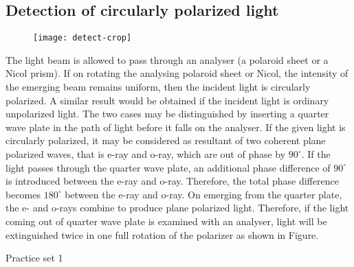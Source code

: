 \subsection{Detection of circularly polarized light}
\begin{figure}[H]
	\centering
	\texttt{[image: detect-crop]}
	\caption{}
	\label{}
\end{figure}
The light beam is allowed to pass through an analyser (a polaroid sheet or a Nicol prism). If on rotating the analysing polaroid sheet or Nicol, the intensity of the emerging beam remains uniform, then the incident light is circularly polarized. A similar result would be obtained if the incident light is ordinary unpolarized light. The two cases may be distinguished by inserting a quarter wave plate in the path of light before it falls on the analyser. If the given light is circularly polarized, it may be considered as resultant of two coherent plane polarized waves, that is e-ray and o-ray, which are out of phase by $90^{\circ}$. If the light passes through the quarter wave plate, an additional phase difference of $90^{\circ}$ is introduced between the e-ray and o-ray. Therefore, the total phase difference becomes $180^{\circ}$ between the e-ray and o-ray. On emerging from the quarter plate, the e- and o-rays combine to produce plane polarized light. Therefore, if the light coming out of quarter wave plate is examined with an analyser, light will be extinguished twice in one full rotation of the polarizer as shown in Figure.\\
\newpage 
\begin{abox}
	Practice set 1
	\end{abox}

